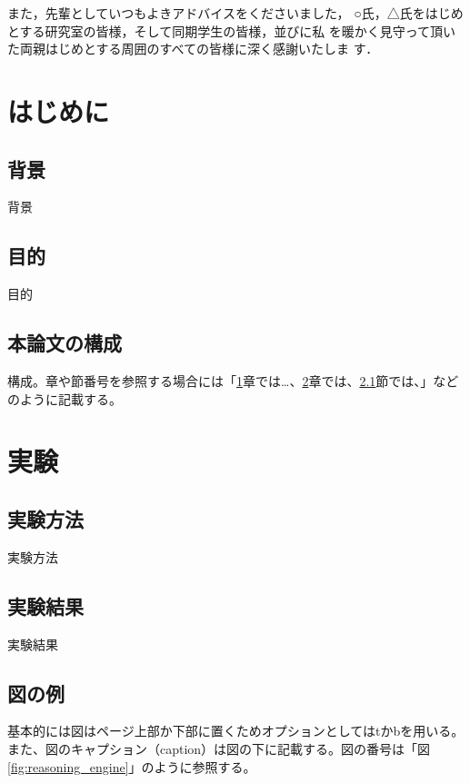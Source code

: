 \documentclass[12pt,dvipdfmx]{jreport}
\begin{document}
また，先輩としていつもよきアドバイスをくださいました，
○氏，△氏をはじめとする研究室の皆様，そして同期学生の皆様，並びに私
を暖かく見守って頂いた両親はじめとする周囲のすべての皆様に深く感謝いたしま
す．

\tableofcontents %
\listoffigures %
\listoftables %


\chapter{はじめに} \label{chap:intro}
\setcounter{page}{1}   %

 \section{背景}
 背景


 \section{目的}
 目的


 \section{本論文の構成}
 構成。章や節番号を参照する場合には「\ref{chap:intro}章では…、\ref{chap:exp}章では、\ref{sec:method}節では、」などのように記載する。
 

\chapter{実験} \label{chap:exp}
 \section{実験方法} \label{sec:method}
 実験方法

 \section{実験結果}
 実験結果

 
 \section{図の例}

 基本的には図はページ上部か下部に置くためオプションとしてはtかbを用いる。また、図のキャプション（caption）は図の下に記載する。図の番号は「図\ref{fig:reasoning_engine}」のように参照する。
 
\end{document}
